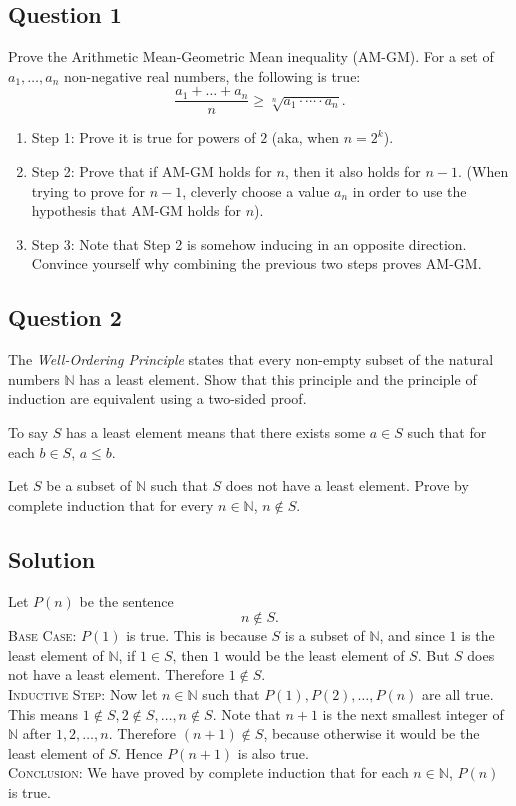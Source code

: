 \documentclass{article}
\begin{document}
\subsection*{Question 1}
    Prove the Arithmetic Mean-Geometric Mean inequality (AM-GM). For a set of $a_{1}, \dots, a_{n}$ non-negative real numbers, the following is true: $$\frac{a_{1} + \dots + a_{n}}{n} \ge \sqrt[n]{a_{1} \cdot \cdots \cdot a_{n}}.$$
    \begin{enumerate}[label = {}]
        \item Step 1: Prove it is true for powers of $2$ (aka, when $n = 2^{k}$).
        \item Step 2: Prove that if AM-GM holds for $n$, then it also holds for $n - 1$. (When trying to prove for $n - 1$, cleverly choose a value $a_{n}$ in order to use the hypothesis that AM-GM holds for $n$).
        \item Step 3: Note that Step 2 is somehow inducing in an opposite direction. Convince yourself why combining the previous two steps proves AM-GM.
    \end{enumerate}


\subsection*{Question 2}
    The \textit{Well-Ordering Principle} states that every non-empty subset of the natural numbers $\mathbb{N}$ has a least element. Show that this principle and the principle of induction are equivalent using a two-sided proof.
    
    To say $S$ has a least element means that there exists some $a \in S$ such that for each $b \in S$, $a \le b$.
    
    Let $S$ be a subset of $\mathbb{N}$ such that $S$ does not have a least element. Prove by complete induction that for every $n \in \mathbb{N}$, $n \notin S$.

\subsection*{Solution}
    Let $P(n)$ be the sentence $$n \notin S.$$
    \textsc{Base Case}: $P(1)$ is true. This is because $S$ is a subset of $\mathbb{N}$, and since $1$ is the least element of $\mathbb{N}$, if $1 \in S$, then $1$ would be the least element of $S$. But $S$ does not have a least element. Therefore $1 \notin S$. \\
    \textsc{Inductive Step}: Now let $n \in \mathbb{N}$ such that $P(1), P(2), \dots, P(n)$ are all true. This means $1 \notin S, 2 \notin S, \dots, n \notin S$. Note that $n + 1$ is the next smallest integer of $\mathbb{N}$ after $1, 2, \dots, n$. Therefore $(n + 1) \notin S$, because otherwise it would be the least element of $S$. Hence $P(n + 1)$ is also true. \\
    \textsc{Conclusion}: We have proved by complete induction that for each $n \in \mathbb{N}$, $P(n)$ is true.
\end{document}
